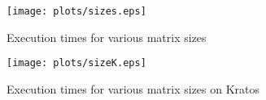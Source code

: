 \documentclass[twocolumn]{article}
\begin{document}
\begin{figure}
  \texttt{[image: plots/sizes.eps]}
  \caption{Execution times for various matrix sizes} \label{fig:time}
\end{figure}

\begin{figure}
  \texttt{[image: plots/sizeK.eps]}
  \caption{Execution times for various matrix sizes on Kratos}
\end{figure}
\end{document}
